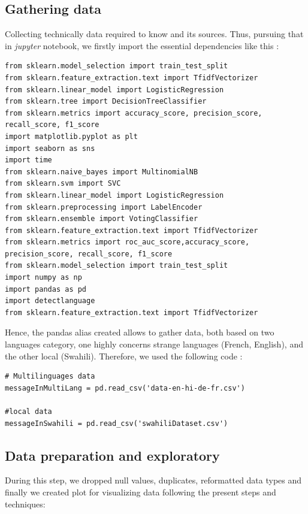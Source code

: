 \documentclass[12pt,a4paper, oneside]{book}
\begin{document}
\subsection{Gathering data} 
Collecting technically data required to know and its sources. Thus, pursuing that in \textit{jupyter} notebook, we firstly import the essential dependencies like this :
\begin{lstlisting}[style=stylejupyter]
from sklearn.model_selection import train_test_split
from sklearn.feature_extraction.text import TfidfVectorizer
from sklearn.linear_model import LogisticRegression 
from sklearn.tree import DecisionTreeClassifier
from sklearn.metrics import accuracy_score, precision_score, recall_score, f1_score
import matplotlib.pyplot as plt 
import seaborn as sns
import time
from sklearn.naive_bayes import MultinomialNB
from sklearn.svm import SVC 
from sklearn.linear_model import LogisticRegression 
from sklearn.preprocessing import LabelEncoder
from sklearn.ensemble import VotingClassifier
from sklearn.feature_extraction.text import TfidfVectorizer
from sklearn.metrics import roc_auc_score,accuracy_score, precision_score, recall_score, f1_score
from sklearn.model_selection import train_test_split
import numpy as np 
import pandas as pd 
import detectlanguage  
from sklearn.feature_extraction.text import TfidfVectorizer
\end{lstlisting}
Hence, the pandas alias created allows to gather data, both based on two languages category, one highly concerns strange languages (French, English), and the other local (Swahili). Therefore, we used the following code : \\

\begin{lstlisting}[style=stylejupyter]
# Multilinguages data
messageInMultiLang = pd.read_csv('data-en-hi-de-fr.csv') 

#local data
messageInSwahili = pd.read_csv('swahiliDataset.csv')
\end{lstlisting}

\subsection{Data preparation and exploratory} 
During this step, we dropped null values, duplicates, reformatted data types and finally we created plot for visualizing data following the present steps and techniques:\\
\end{document}

